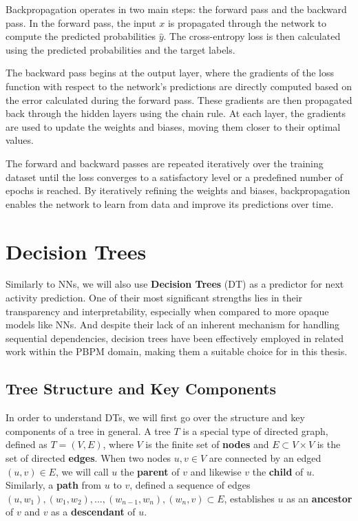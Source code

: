 Backpropagation operates in two main steps: the forward pass and the backward pass.
In the forward pass,
the input $x$ is propagated through the network to compute the predicted probabilities $\hat{y}$.
The cross-entropy loss is then calculated using the predicted probabilities and the target labels.

The backward pass begins at the output layer,
where the gradients of the loss function with respect to the network's predictions are directly computed
based on the error calculated during the forward pass.
These gradients are then propagated back through the hidden layers using the chain rule.
At each layer, the gradients are used to update the weights and biases,
moving them closer to their optimal values.

The forward and backward passes are repeated iteratively over the training dataset
until the loss converges to a satisfactory level or a predefined number of epochs is reached.
By iteratively refining the weights and biases,
backpropagation enables the network to learn from data and improve its predictions over time.

\section{Decision Trees}
\label{sec:dt}
Similarly to NNs, we will also use \textbf{Decision Trees} (DT) \cite{trees} as a predictor for next activity prediction.
One of their most significant strengths lies in their transparency and interpretability,
especially when compared to more opaque models like NNs.
And despite their lack of an inherent mechanism for handling sequential dependencies,
decision trees have been effectively employed in related work \cite{fairness_foundation} within the PBPM domain,
making them a suitable choice for in this thesis. 

\subsection{Tree Structure and Key Components}
In order to understand DTs, we will first go over the structure and key components of a tree in general.
\cite{trees_structure}
A tree $T$ is a special type of directed graph, defined as $T=(V,E)$,
where $V$ is the finite set of \textbf{nodes} and $E \subset V \times V$ is the set of directed \textbf{edges}.
When two nodes $u,v \in V$ are connected by an edged $(u,v) \in E$,
we will call $u$ the \textbf{parent} of $v$ and likewise $v$ the \textbf{child} of $u$.
Similarly, a \textbf{path} from $u$ to $v$,
defined a sequence of edges $(u,w_1), (w_1,w_2), ..., (w_{n-1},w_n),(w_n, v) \subset E$,
establishes $u$ as an \textbf{ancestor} of $v$ and $v$ as a \textbf{descendant} of $u$.


